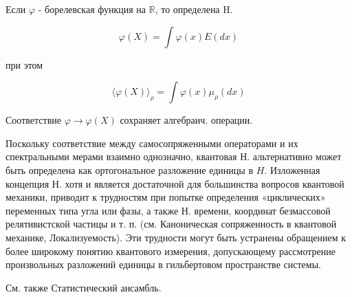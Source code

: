 \documentclass[10pt]{article}
\begin{document}
Если $\varphi$ - борелевская функция на $\mathbb{R}$, то определена $\mathrm{H}$.



\[

\varphi(X)=\int \varphi(x) E(d x)

\]



при этом



\[

\langle\varphi(X)\rangle_{\rho}=\int \varphi(x) \mu_{\rho}(d x)

\]



Соответствие $\varphi \rightarrow \varphi(X)$ сохраняет алгебраич. операции.



Поскольку соответствие между самосопряженными операторами и их спектральными мерами взаимно однозначно, квантовая Н. альтернативно может быть определена как ортогональное разложение единицы в $H$. Изложенная концепция Н. хотя и является достаточной для большинства вопросов квантовой механики, приводит к трудностям при попытке определения «циклических» переменных типа угла или фазы, а также Н. времени, координат безмассовой релятивистской частицы и т. п. (см. Каноническая сопряженность в квантовой механике, Локализуемость). Эти трудности могут быть устранены обращением к более широкому понятию квантового измерения, допускающему рассмотрение произвольных разложений единицы в гильбертовом пространстве системы.



См. также Статистический ансамбль.
\end{document}
